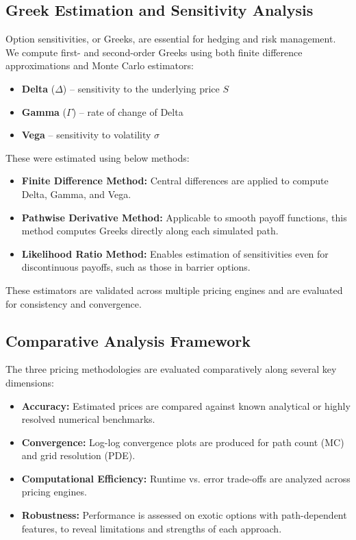 \documentclass[12pt,a4paper]{article}
\begin{document}
\subsection{Greek Estimation and Sensitivity Analysis}
Option sensitivities, or Greeks, are essential for hedging and risk management. We compute first- and second-order Greeks using both finite difference approximations and Monte Carlo estimators:

\begin{itemize}
  \item \textbf{Delta} (\( \Delta \)) – sensitivity to the underlying price \( S \)
  \item \textbf{Gamma} (\( \Gamma \)) – rate of change of Delta
  \item \textbf{Vega} – sensitivity to volatility \( \sigma \)
\end{itemize}

These were estimated using below methods:

\begin{itemize}
    \item \textbf{Finite Difference Method:} Central differences are applied to compute Delta, Gamma, and Vega.
    \item \textbf{Pathwise Derivative Method:} Applicable to smooth payoff functions, this method computes Greeks directly along each simulated path.
    \item \textbf{Likelihood Ratio Method:} Enables estimation of sensitivities even for discontinuous payoffs, such as those in barrier options.
\end{itemize}

These estimators are validated across multiple pricing engines and are evaluated for consistency and convergence.

\subsection{Comparative Analysis Framework}

The three pricing methodologies are evaluated comparatively along several key dimensions:

\begin{itemize}
    \item \textbf{Accuracy:} Estimated prices are compared against known analytical or highly resolved numerical benchmarks.
    \item \textbf{Convergence:} Log-log convergence plots are produced for path count (MC) and grid resolution (PDE).
    \item \textbf{Computational Efficiency:} Runtime vs. error trade-offs are analyzed across pricing engines.
    \item \textbf{Robustness:} Performance is assessed on exotic options with path-dependent features, to reveal limitations and strengths of each approach.
\end{itemize}
\end{document}
